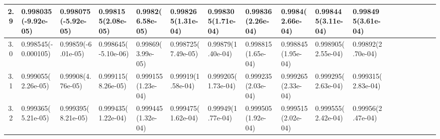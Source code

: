 \documentclass[
	article,			%
	12pt,				%
	twoside,			%
	a4paper,			%
	english,			%
	brazil,				%
	]{abntex2}
\begin{document}
\begin{landscape}
\begin{table}
\begin{tabular}{c||p{18mm}|p{18mm}|p{18mm}|p{18mm}|p{18mm}|p{18mm}|p{18mm}|p{18mm}|p{18mm}|p{18mm}|p{18mm}|p{18mm}|p{18mm}|p{18mm}|p{18mm}|p{18mm}|p{18mm}}
    			2.9 &0.998035\newline(-9.92e-05)&0.998075\newline(-5.92e-05)&0.998155\newline(2.08e-05)&0.9982\newline(6.58e-05)&0.998265\newline(1.31e-04)&0.998305\newline(1.71e-04)&0.99836\newline(2.26e-04)&0.9984\newline(2.66e-04)&0.998445\newline(3.11e-04)&0.998495\newline(3.61e-04)\\\hline
    			3.0 &0.998545\newline(-0.000105)&0.99859\newline(-6.01e-05)&0.998645\newline(-5.10e-06)&0.99869\newline(3.99e-05)&0.998725\newline(7.49e-05)&0.99879\newline(1.40e-04)&0.998815\newline(1.65e-04)&0.998845\newline(1.95e-04)&0.998905\newline(2.55e-04)&0.99892\newline(2.70e-04)\\\hline
    			3.1 &0.999055\newline(2.26e-05)&0.99908\newline(4.76e-05)&0.999115\newline(8.26e-05)&0.999155\newline(1.23e-04)&0.99919\newline(1.58e-04)&0.999205\newline(1.73e-04)&0.999235\newline(2.03e-04)&0.999265\newline(2.33e-04)&0.999295\newline(2.63e-04)&0.999315\newline(2.83e-04)\\\hline
    			3.2 &0.999365\newline(5.21e-05)&0.999395\newline(8.21e-05)&0.999435\newline(1.22e-04)&0.999445\newline(1.32e-04)&0.999475\newline(1.62e-04)&0.99949\newline(1.77e-04)&0.999505\newline(1.92e-04)&0.999515\newline(2.02e-04)&0.999555\newline(2.42e-04)&0.99956\newline(2.47e-04)\\\hline
    			


\end{tabular}
\end{table}
\end{landscape}
\end{document}
